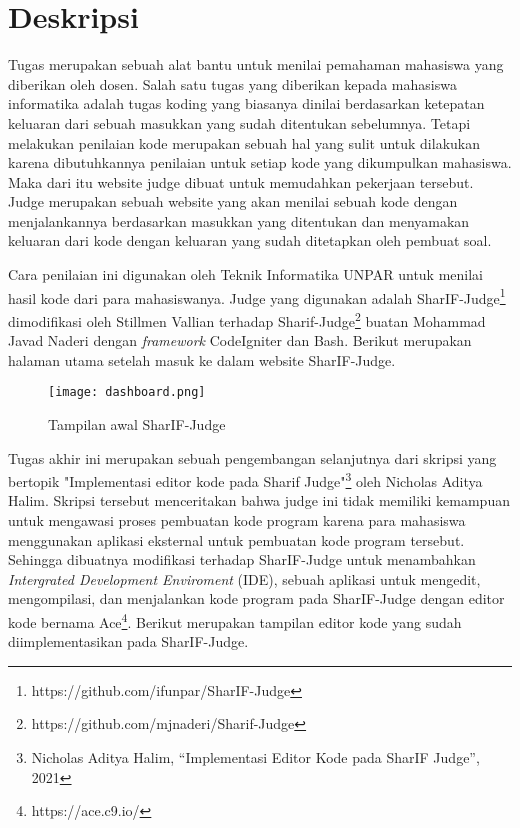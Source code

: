 \documentclass[a4paper,twoside]{article}
\begin{document}
\title{\@judultopik}
\author{\nama \textendash \@npm} 

\newcommand{\nama}{Andreas Ronaldi}
\newcommand{\@npm}{6182101026}
\newcommand{\@judultopik}{Pemutar Ulang Ketikan Mahasiswa pada SharIF Judge } %
\newcommand{\jumpemb}{1} %
\newcommand{\tanggal}{09/18/2024}


\maketitle


\section{Deskripsi}
Tugas merupakan sebuah alat bantu untuk menilai pemahaman mahasiswa yang diberikan oleh dosen. Salah satu tugas yang diberikan kepada mahasiswa informatika adalah tugas koding yang biasanya dinilai berdasarkan ketepatan keluaran dari sebuah masukkan yang sudah ditentukan sebelumnya. Tetapi melakukan penilaian kode merupakan sebuah hal yang sulit untuk dilakukan karena dibutuhkannya penilaian untuk setiap kode yang dikumpulkan mahasiswa. Maka dari itu website judge dibuat untuk memudahkan pekerjaan tersebut. Judge merupakan sebuah website yang akan menilai sebuah kode dengan menjalankannya berdasarkan masukkan yang ditentukan dan menyamakan keluaran dari kode dengan keluaran yang sudah ditetapkan oleh pembuat soal. 

Cara penilaian ini digunakan oleh Teknik Informatika UNPAR untuk menilai hasil kode dari para mahasiswanya. Judge yang digunakan adalah SharIF-Judge\footnote{https://github.com/ifunpar/SharIF-Judge} dimodifikasi oleh Stillmen Vallian terhadap Sharif-Judge\footnote{https://github.com/mjnaderi/Sharif-Judge} buatan Mohammad Javad Naderi dengan \textit{framework} CodeIgniter dan Bash. Berikut merupakan halaman utama setelah masuk ke dalam website SharIF-Judge.

\begin{figure}[H]
    \centering
    \texttt{[image: dashboard.png]}
    \caption{Tampilan awal SharIF-Judge}
\end{figure}

Tugas akhir ini merupakan sebuah pengembangan selanjutnya dari skripsi yang bertopik "Implementasi editor kode pada Sharif Judge"\footnote{Nicholas Aditya Halim, “Implementasi Editor Kode pada SharIF Judge”, 2021} oleh Nicholas Aditya Halim. Skripsi tersebut menceritakan bahwa judge ini tidak memiliki kemampuan untuk mengawasi proses pembuatan kode program karena para mahasiswa menggunakan aplikasi eksternal untuk pembuatan kode program tersebut. Sehingga dibuatnya modifikasi terhadap SharIF-Judge untuk menambahkan \textit{Intergrated Development Enviroment} (IDE), sebuah aplikasi untuk mengedit, mengompilasi, dan menjalankan kode program pada SharIF-Judge dengan editor kode bernama Ace\footnote{https://ace.c9.io/}. Berikut merupakan tampilan editor kode yang sudah diimplementasikan pada SharIF-Judge.
\end{document}
